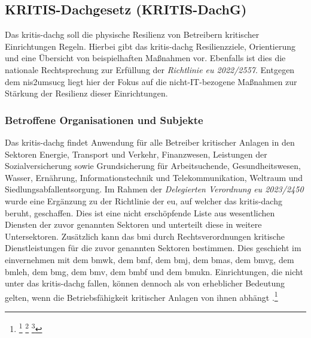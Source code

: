 \documentclass[11pt,a4paper,hidelinks]{article}   %
\begin{document}
            \subsection{KRITIS-Dachgesetz (KRITIS-DachG)}
                Das \gls{kritis-dachg} soll die physische Resilienz von Betreibern kritischer Einrichtungen Regeln. Hierbei gibt das \gls{kritis-dachg} Resilienzziele, Orientierung und eine Übersicht von beispielhaften Maßnahmen vor. Ebenfalls ist dies die nationale Rechtsprechung zur Erfüllung der \emph{Richtlinie \gls{eu} 2022/2557}. Entgegen dem \gls{nis2umsucg} liegt hier der Fokus auf die nicht-IT-bezogene Maßnahmen zur Stärkung der Resilienz dieser Einrichtungen.
                \subsubsection{Betroffene Organisationen und Subjekte}
                Das \gls{kritis-dachg} findet Anwendung für alle Betreiber kritischer Anlagen in den Sektoren Energie, Transport und Verkehr, Finanzwesen, Leistungen der Sozialversicherung sowie Grundsicherung für Arbeitsuchende, Gesundheitswesen, Wasser, Ernährung, Informationstechnik und Telekommunikation, Weltraum und Siedlungsabfallentsorgung. Im Rahmen der \emph{Delegierten Verordnung \gls{eu} 2023/2450} wurde eine Ergänzung zu der Richtlinie der \gls{eu}, auf welcher das \gls{kritis-dachg} beruht, geschaffen. Dies ist eine nicht erschöpfende Liste aus wesentlichen Diensten der zuvor genannten Sektoren und unterteilt diese in weitere Untersektoren. Zusätzlich kann das \gls{bmi} durch Rechtsverordnungen kritische Dienstleistungen für die zuvor genannten Sektoren bestimmen. Dies geschieht im einvernehmen mit dem \gls{bmwk}, dem \gls{bmf}, dem \gls{bmj}, dem \gls{bmas}, dem \gls{bmvg}, dem \gls{bmleh}, dem \gls{bmg}, dem \gls{bmv}, dem \gls{bmbf} und dem \gls{bmukn}. Einrichtungen, die nicht unter das \gls{kritis-dachg} fallen, können dennoch als von erheblicher Bedeutung gelten, wenn die Betriebsfähigkeit kritischer Anlagen von ihnen abhängt .\footnote{
                    \footcite[Vgl. §4, Absatz 1,][]{KRITIS-DachG}
                    \footcite[Vgl. §4, Absatz 3 \& 4,][]{KRITIS-DachG}
                    \footcite[Vgl. Artikel 2, Nummer 1,][]{EU2023-2450}
                }
\end{document}
